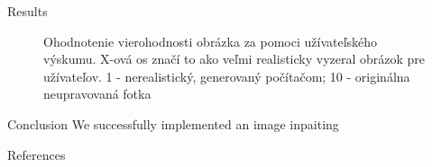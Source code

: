 \documentclass[10pt,xcolor=pdflatex]{beamer}
\begin{document}
	\begin{frame}{Results}
		\begin{figure}[h!]
			\begin{center}
			
				\caption{
					Ohodnotenie vierohodnosti obrázka za pomoci užívateľského výskumu. X-ová os značí to ako veľmi realisticky vyzeral obrázok pre užívateľov. 1 - nerealistický, generovaný počítačom; 10 - originálna neupravovaná fotka
				}
				\label{user_research}
			\end{center}
		\end{figure}
	\end{frame}

	\begin{frame}{Conclusion}
		We successfully implemented an image inpaiting 
	\end{frame}


	
	\begin{frame}{References}
		\nocite{*}
		
	\end{frame}
	
\end{document}
